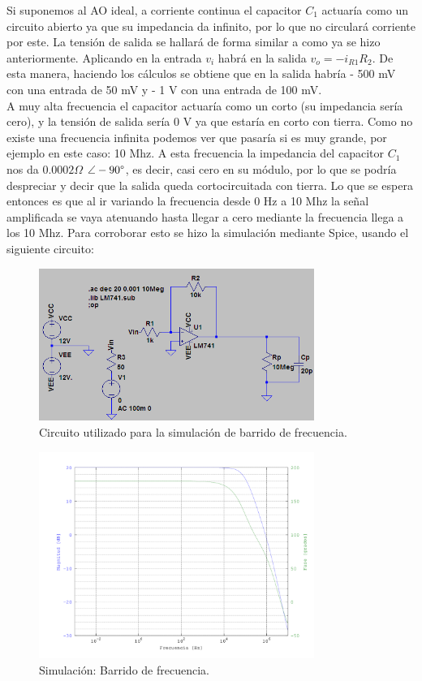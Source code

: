 Si suponemos al AO ideal, a corriente continua el capacitor $C_{1}$ actuaría como un circuito abierto ya que su impedancia da infinito, por lo que no circulará corriente por este. La tensión de salida se hallará de forma similar a como ya se hizo anteriormente. Aplicando en la entrada $v_{i}$ habrá en la salida $v_{o} = - i_{R1} R_{2}$. De esta manera, haciendo los cálculos se obtiene que en la salida habría - 500 mV con una entrada de 50 mV y - 1 V con una entrada de 100 mV.\\
A muy alta frecuencia el capacitor actuaría como un corto (su impedancia sería cero), y la tensión de salida sería 0 V ya que estaría en corto con tierra. Como no existe una frecuencia infinita podemos ver que pasaría si es muy grande, por ejemplo en este caso: 10 Mhz. A esta frecuencia la impedancia del capacitor $C_{1}$ nos da $0.0002 \Omega$ $\angle-90\degree$, es decir, casi cero en su módulo, por lo que se podría despreciar y decir que la salida queda cortocircuitada con tierra.
Lo que se espera entonces es que al ir variando la frecuencia desde 0 Hz a 10 Mhz la señal amplificada se vaya atenuando hasta llegar a cero mediante la frecuencia llega a los 10 Mhz. Para corroborar esto se hizo la simulación mediante Spice, usando el siguiente circuito:

\begin{figure}[H]
  \centering      \includegraphics[width=0.8\textwidth]{gfxhernan/barrido2.PNG}
  \caption{Circuito utilizado para la simulación de barrido de frecuencia.}
\end{figure}


\begin{figure}[H]
  \centering      \includegraphics[width=0.8\textwidth]{gfxhernan/FIG_barrido_V_100.png}
  \caption{Simulación: Barrido de frecuencia.}
    \label{f:inv}
\end{figure}


